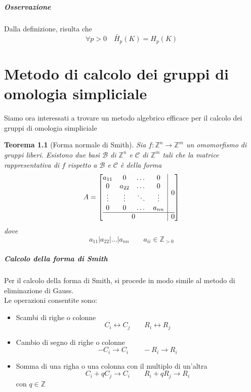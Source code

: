 \documentclass[a4paper]{report}
\newtheorem{theorem}{Teorema}
\newcommand{\Z}{\ensuremath{\mathbb{Z}}}
\newcommand{\ra}{\ensuremath{\rightarrow}}
\begin{document}
\paragraph{Osservazione} Dalla definizione, risulta che
\[
    \forall p>0\quad \tilde{H_p}(K)=H_p(K)
\]
\chapter{Metodo di calcolo dei gruppi di omologia simpliciale}
Siamo ora interessati a trovare un metodo algebrico efficace per il calcolo dei gruppi di omologia simpliciale
\begin{theorem}[Forma normale di Smith]
    Sia $f:\Z^n\ra\Z^m$ un omomorfismo di gruppi liberi. Esistono due basi $\mathcal{B}$ di $\Z^n$ e $\mathcal{C}$ di $\Z^m$ tali che la matrice rappresentativa di $f$ rispetto a $\mathcal{B}$ e $\mathcal{C}$ è della forma
    \[
        A=\left[\begin{array}{@{}c|c@{}}
                \begin{matrix}
                    a_{11} & 0      & \dots  & 0      \\
                    0      & a_{22} & \dots  & 0      \\
                    \vdots & \vdots & \ddots & \vdots \\
                    0      & 0      & \dots  & a_{nn}
                \end{matrix}
                  & 0 \\
                \hline
                0 & 0
            \end{array}\right]
    \]
    dove
    \[
        a_{11}|a_{22}|\dots|a_{nn}\quad\quad a_{ii}\in\Z_{>0}
    \]
\end{theorem}
\paragraph{Calcolo della forma di Smith} Per il calcolo della forma di Smith, si procede in modo simile al metodo di eliminazione di Gauss.\\
Le operazioni consentite sono:
\begin{itemize}
    \item Scambi di righe o colonne
          \[
              C_i\longleftrightarrow C_j\quad\quad R_i\longleftrightarrow R_j
          \]
    \item Cambio di segno di righe o colonne
          \[
              -C_i\longrightarrow C_i\quad\quad -R_i\longrightarrow R_i
          \]
    \item Somma di una righa o una colonna con il multiplo di un'altra
          \[
              C_i+qC_j\longrightarrow C_i\quad\quad R_i+qR_j\longrightarrow R_i
          \]
          con $q\in\Z$
\end{itemize}
\end{document}
